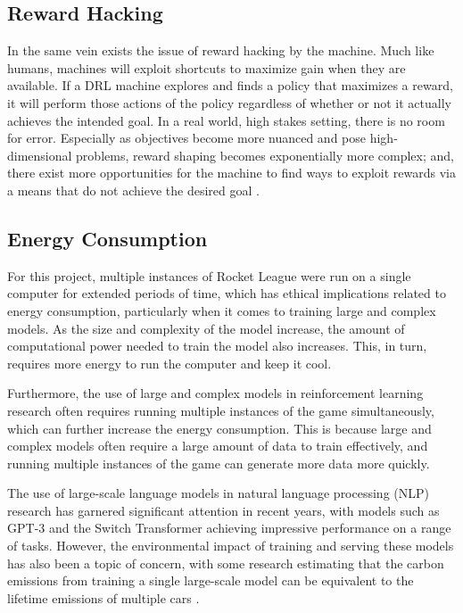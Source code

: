 \documentclass[10pt,twocolumn]{article}
\begin{document}
\subsection{Reward Hacking}
 In the same vein exists the issue of reward hacking by the 
 machine. Much like humans, machines will exploit shortcuts 
 to maximize gain when they are available. If a DRL machine 
 explores and finds a policy that maximizes a reward, it will 
 perform those actions of the policy regardless of whether or 
 not it actually achieves the intended goal. In a real world, 
 high stakes setting, there is no room for error. Especially 
 as objectives become more nuanced and pose high-dimensional 
 problems, reward shaping becomes exponentially more complex; 
 and, there exist more opportunities for the machine to find 
 ways to exploit rewards via a means that do not achieve the 
 desired goal \cite{frye_2021}.

\subsection{Energy Consumption}
 For this project, multiple instances of Rocket League were 
 run on a single computer for extended periods of time, which 
 has ethical implications related to energy consumption, 
 particularly when it comes to training large and complex 
 models. As the size and complexity of the model increase, 
 the amount of computational power needed to train the model 
 also increases. This, in turn, requires more energy to run 
 the computer and keep it cool.

 Furthermore, the use of large and complex models in 
 reinforcement learning research often requires running 
 multiple instances of the game simultaneously, which can 
 further increase the energy consumption. This is because 
 large and complex models often require a large amount of 
 data to train effectively, and running multiple instances of 
 the game can generate more data more quickly.

 The use of large-scale language models in natural language 
 processing (NLP) research has garnered significant attention 
 in recent years, with models such as GPT-3 and the Switch 
 Transformer achieving impressive performance on a range of 
 tasks. However, the environmental impact of training and 
 serving these models has also been a topic of concern, with 
 some research estimating that the carbon emissions from 
 training a single large-scale model can be equivalent to the 
 lifetime emissions of multiple cars \cite{gupta_2021}.
 
\printbibliography
\end{document}
